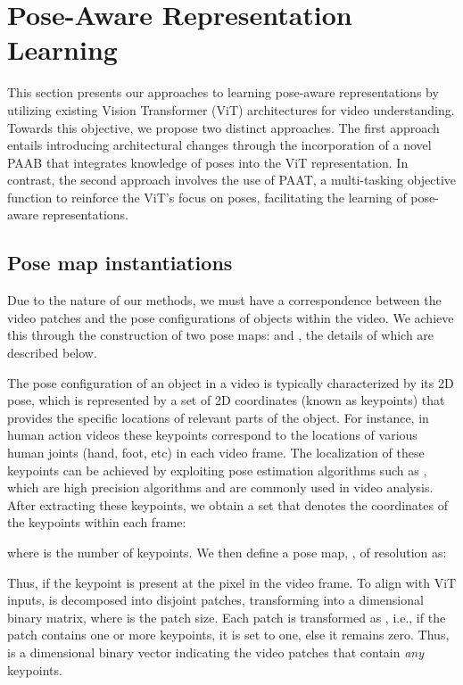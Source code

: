 \documentclass{article}
\begin{document}
\section{Pose-Aware Representation Learning}
This section presents our approaches to learning pose-aware representations by utilizing existing Vision Transformer (ViT) architectures for video understanding. Towards this objective, we propose two distinct approaches. The first approach entails introducing architectural changes through the incorporation of a novel PAAB that integrates knowledge of poses into the ViT representation. In contrast, the second approach involves the use of PAAT, a multi-tasking objective function to reinforce the ViT's focus on poses, facilitating the learning of pose-aware representations.






\subsection{Pose map instantiations}\label{pose_map_init}
Due to the nature of our methods, we must have a correspondence between the video patches and the pose configurations of objects within the video. We achieve this through the construction of two pose maps:  and , the details of which are described below.

The pose configuration of an object in a video is typically characterized by its 2D pose, which is represented by a set of 2D coordinates (known as keypoints) that provides the specific locations of relevant parts of the object. For instance, in human action videos these keypoints correspond to the locations of various human joints (hand, foot, etc) in each video frame. The localization of these keypoints can be achieved by exploiting pose estimation algorithms such as \cite{OpenPose, fang2017rmpe}, which are high precision algorithms and are commonly used in video analysis. After extracting these keypoints, we obtain a set  that denotes the coordinates of the keypoints within each frame:


where  is the number of keypoints. We then define a pose map, , of resolution  as:
\vspace{-0.025in}


Thus,  if the  keypoint is present at the  pixel in the  video frame. To align with ViT inputs,  is decomposed into  disjoint patches, transforming  into a  dimensional binary matrix, where  is the patch size. Each patch is transformed as , i.e., if the patch  contains one or more keypoints, it is set to one, else it remains zero. Thus,  is a  dimensional binary vector indicating the video patches that contain \textit{any} keypoints.
\end{document}
